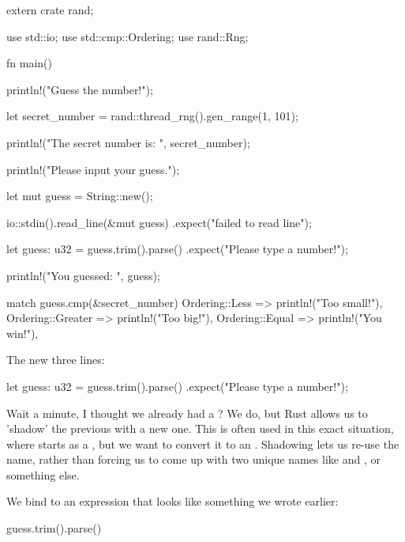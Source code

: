 \begin{rustc}
extern crate rand;

use std::io;
use std::cmp::Ordering;
use rand::Rng;

fn main() {
    println!("Guess the number!");

    let secret_number = rand::thread_rng().gen_range(1, 101);

    println!("The secret number is: {}", secret_number);

    println!("Please input your guess.");

    let mut guess = String::new();

    io::stdin().read_line(&mut guess)
        .expect("failed to read line");

    let guess: u32 = guess.trim().parse()
        .expect("Please type a number!");

    println!("You guessed: {}", guess);

    match guess.cmp(&secret_number) {
        Ordering::Less    => println!("Too small!"),
        Ordering::Greater => println!("Too big!"),
        Ordering::Equal   => println!("You win!"),
    }
}
\end{rustc}

The new three lines:

\begin{rustc}
    let guess: u32 = guess.trim().parse()
        .expect("Please type a number!");
\end{rustc}

Wait a minute, I thought we already had a ? We do, but Rust allows us to 'shadow' the previous  with a new
one. This is often used in this exact situation, where  starts as a , but we want to convert it to an 
. Shadowing lets us re-use the  name, rather than forcing us to come up with two unique names like 
 and , or something else.

\blank

We bind  to an expression that looks like something we wrote earlier:

\begin{rustc}
guess.trim().parse()
\end{rustc}

